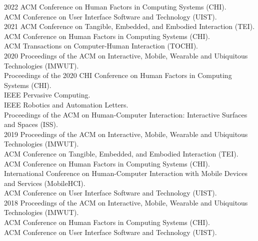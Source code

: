   \pagebreak
    \begin{cvreviews}
      \cvreview
        {2022}
        {ACM Conference on Human Factors in Computing Systems (CHI).\\
        ACM Conference on User Interface Software and Technology (UIST). \\}
      \cvreview
        {2021}
        {ACM Conference on Tangible, Embedded, and Embodied Interaction (TEI).\\
        ACM Conference on Human Factors in Computing Systems (CHI).\\
        ACM Transactions on Computer-Human Interaction (TOCHI).\\}
      \cvreview
        {2020}
        {Proceedings of the ACM on Interactive, Mobile, Wearable and Ubiquitous Technologies (IMWUT).\\
        Proceedings of the 2020 CHI Conference on Human Factors in Computing Systems (CHI).\\
        IEEE Pervasive Computing.\\
        IEEE Robotics and Automation Letters.\\
        Proceedings of the ACM on Human-Computer Interaction: Interactive Surfaces and Spaces (ISS).\\}
      \cvreview
        {2019}
        {Proceedings of the ACM on Interactive, Mobile, Wearable and Ubiquitous Technologies (IMWUT).\\
        ACM Conference on Tangible, Embedded, and Embodied Interaction (TEI).\\
        ACM Conference on Human Factors in Computing Systems (CHI).\\
        International Conference on Human-Computer Interaction with Mobile Devices and Services (MobileHCI).\\
        ACM Conference on User Interface Software and Technology (UIST). \\}
      \cvreview
        {2018}
        {Proceedings of the ACM on Interactive, Mobile, Wearable and Ubiquitous Technologies (IMWUT).\\
        ACM Conference on Human Factors in Computing Systems (CHI).\\
        ACM Conference on User Interface Software and Technology (UIST). \\}
    \end{cvreviews}